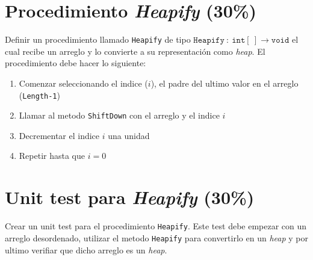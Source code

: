 \documentclass{article}
\begin{document}
\section*{Procedimiento \emph{Heapify} (30\%)}
Definir un procedimiento llamado \texttt{Heapify}\cite{HeapSort} de tipo $\mathtt{Heapify}\ :\ \mathtt{int}[\ ]
\rightarrow \mathtt{void}$ el cual recibe un arreglo y lo convierte a su representaci\'on como
\emph{heap}. El procedimiento debe hacer lo siguiente:
\begin{enumerate}
        \item{Comenzar seleccionando el indice ($i$), el padre del ultimo valor en el arreglo (\texttt{Length-1})}
        \item{Llamar al metodo \texttt{ShiftDown} con el arreglo y el indice $i$}
        \item{Decrementar el indice $i$ una unidad}
        \item{Repetir hasta que $i=0$}
\end{enumerate}

\section*{Unit test para \emph{Heapify} (30\%)}
Crear un unit test para el procedimiento \texttt{Heapify}. Este test debe empezar con
un arreglo desordenado, utilizar el metodo \texttt{Heapify} para convertirlo en un \emph{heap}
y por ultimo verifiar que dicho arreglo es un \emph{heap}.



\end{document}
